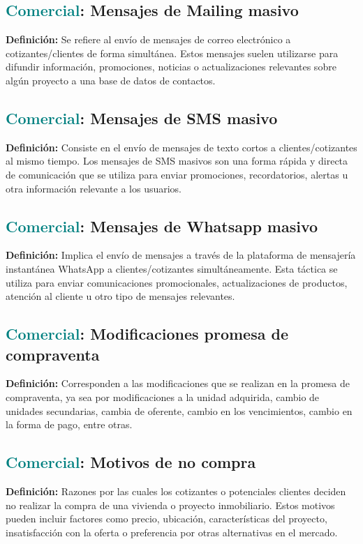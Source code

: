 \documentclass[12pt]{article}
\begin{document}
\subsection{\textcolor{teal}{Comercial}: Mensajes de Mailing masivo}
\textbf{Definición:} Se refiere al envío de mensajes de correo electrónico a cotizantes/clientes de forma simultánea. Estos mensajes suelen utilizarse para difundir información, promociones, noticias o actualizaciones relevantes sobre algún proyecto a una base de datos de contactos.
\subsection{\textcolor{teal}{Comercial}: Mensajes de SMS masivo}
\textbf{Definición:} Consiste en el envío de mensajes de texto cortos a clientes/cotizantes al mismo tiempo. Los mensajes de SMS masivos son una forma rápida y directa de comunicación que se utiliza para enviar promociones, recordatorios, alertas u otra información relevante a los usuarios.
\subsection{\textcolor{teal}{Comercial}: Mensajes de Whatsapp masivo}
\textbf{Definición:} Implica el envío de mensajes a través de la plataforma de mensajería instantánea WhatsApp a clientes/cotizantes simultáneamente. Esta táctica se utiliza para enviar comunicaciones promocionales, actualizaciones de productos, atención al cliente u otro tipo de mensajes relevantes.
\subsection{\textcolor{teal}{Comercial}: Modificaciones promesa de compraventa}
\textbf{Definición:} Corresponden a las modificaciones que se realizan en la promesa de compraventa, ya sea por modificaciones a la unidad adquirida, cambio de unidades secundarias, cambia de oferente, cambio en los vencimientos, cambio en la forma de pago, entre otras.
\subsection{\textcolor{teal}{Comercial}: Motivos de no compra}
\textbf{Definición:} Razones por las cuales los cotizantes o potenciales clientes deciden no realizar la compra de una vivienda o proyecto inmobiliario. Estos motivos pueden incluir factores como precio, ubicación, características del proyecto, insatisfacción con la oferta o preferencia por otras alternativas en el mercado.
\end{document}
